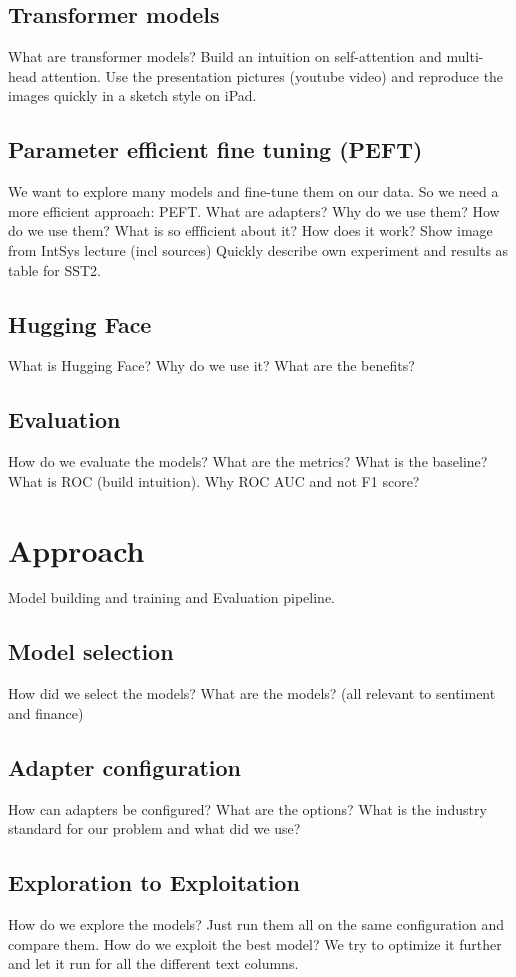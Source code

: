 \documentclass[conference]{IEEEtran}
\begin{document}
\subsection{Transformer models}
What are transformer models? 
Build an intuition on self-attention and multi-head attention. 
Use the presentation pictures (youtube video) and reproduce the images quickly in a sketch style on iPad.
\subsection{Parameter efficient fine tuning (PEFT)}
We want to explore many models and fine-tune them on our data. So we need a more efficient approach: PEFT.
What are adapters? Why do we use them? How do we use them?
What is so effficient about it? How does it work?
Show image from IntSys lecture (incl sources)
Quickly describe own experiment and results as table for SST2.
\subsection{Hugging Face}
What is Hugging Face? Why do we use it? What are the benefits?
\subsection{Evaluation}
How do we evaluate the models? What are the metrics? What is the baseline?
What is ROC (build intuition).
Why ROC AUC and not F1 score?

\section{Approach}
Model building and training and Evaluation pipeline.
\subsection{Model selection}
How did we select the models? What are the models?
(all relevant to sentiment and finance)
\subsection{Adapter configuration}
How can adapters be configured? What are the options? What is the industry standard for our problem and what did we use?
\subsection{Exploration to Exploitation}
How do we explore the models? Just run them all on the same configuration and compare them.
How do we exploit the best model? We try to optimize it further and let it run for all the different text columns.
\end{document}
